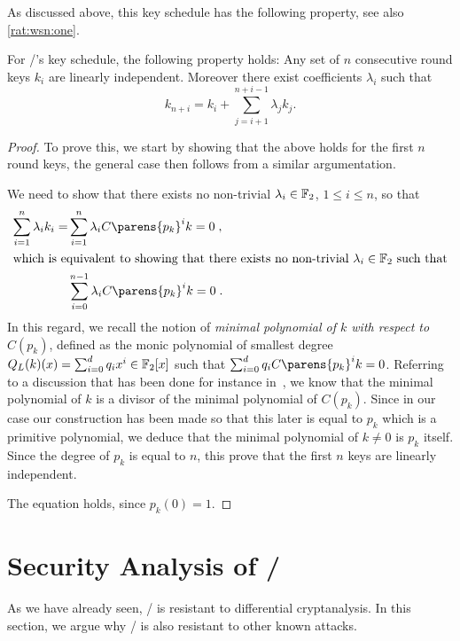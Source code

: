 As discussed above, this key schedule has the following property, see also \cref{rat:wsn:one}.
\begin{lemma}\label{bison:lem:ks}
    For \bison/'s key schedule, the following property holds:
    Any set of $n$ consecutive round keys $k_i$ are linearly independent.
    Moreover there exist coefficients $\lambda_i$ such that
        \begin{equation*}
            k_{n+i} = k_i + \sum_{j=i+1}^{n+i-1} \lambda_j k_j.
        \end{equation*}
\end{lemma}
\begin{proof}
    To prove this, we start by showing that the above holds for the first $n$ round keys, the general case then follows from a similar argumentation.

    We need to show that there exists no non-trivial $\lambda_i \in \mathbb{F}_2$, $1 \leqslant i \leqslant n$, so that
    \begin{align*}
        \sum_{i=1}^{n} \lambda_i k_i = &\sum_{i=1}^{n} \lambda_i C\parens{p_{k}}^i k = 0\;, \\
        \intertext{which is equivalent to showing that there exists no non-trivial $\lambda_i \in \F_2$ such that}
        &\sum_{i=0}^{n-1} \lambda_i C\parens{p_{k}}^i k = 0\;.
    \end{align*}
    In this regard, we recall the notion of \emph{minimal polynomial of $k$ with respect to $C(p_{k})$}, defined as the monic polynomial of smallest degree $Q_L(k)(x) = \sum_{i=0}^{d} q_i x^i \in \mathbb{F}_2[x]$  such that $\sum_{i=0}^{d} q_i C\parens{p_{k}}^i k = 0$.
    Referring to a discussion that has been done for instance in~\cite{C:BCLR17}, we know that the minimal polynomial of $k$ is a divisor of the minimal polynomial of $C(p_{k})$.
    Since in our case our construction has been made so that this later is equal to $p_k$ which is a primitive polynomial, we deduce that the minimal polynomial of $k \ne 0$ is $p_{k}$ itself.
    Since the degree of $p_{k}$ is equal to $n$, this prove that the first $n$ keys are linearly independent.

    The equation holds, since $p_k(0) = 1$.
\end{proof}

\section{Security Analysis of \bison/}\label{sec:bison:analysis}
As we have already seen, \bison/ is resistant to differential cryptanalysis.
In this section, we argue why \bison/ is also resistant to other known attacks.

